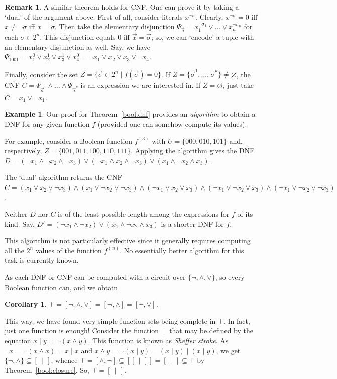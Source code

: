 \documentclass[12pt,notitlepage]{article}
\theoremstyle{plain}
\newtheorem{corr}[thm]{Corollary}
\theoremstyle{definition}
\newtheorem{exm}[thm]{Example}
\newtheorem{rem}[thm]{Remark}
\theoremstyle{plain}
\newcommand{\sbs}{\subseteq}
\newcommand{\void}{\varnothing}
\newcommand{\ul}[1]{\underline{#1}}
\newcommand{\1}{\mathbf{1}}
\newcommand{\0}{\mathbf{0}}
\newcommand{\dvd}{\mathop{\mid}}
\begin{document}
\begin{rem}
A similar theorem holds for CNF. One can prove it by taking a `dual' of the argument above. First of all, consider literals $x^{\neg \sigma}$. Clearly, $x^{\neg \sigma} = 0$ iff $x \neq \neg \sigma$ iff $x = \sigma$. Then take the elementary disjunction $\Psi_{\vec\sigma} = x^{\neg \sigma_1}_1 \vee \ldots \vee x^{\neg \sigma_n}_n$ for each $\sigma \in \ul{2}^n$. This disjunction equals $0$ iff $\vec x = \vec \sigma$; so, we can `encode' a tuple with an elementary disjunction as well. Say, we have $\Psi_{1001} = x^0_1 \vee x^1_2 \vee x^1_3 \vee x^0_4  = \neg x_1 \vee x_2 \vee x_3 \vee \neg x_4$.

Finally, consider the set $Z = \{ \vec \sigma \in \ul{2}^n \mid f(\vec\sigma) = 0 \}$. If $Z = \{\vec\sigma^1, \ldots,  \vec\sigma^k\} \neq \void$, the CNF $C =  \Psi_{\vec \sigma^1} \wedge \ldots \wedge \Psi_{\vec \sigma^k}$ is an expression we are interested in. If $Z = \void$, just take $C = x_1 \vee \neg x_1$.
\end{rem}

\begin{exm}
Our proof for Theorem~\ref{bool:dnf} provides an \emph{algorithm} to obtain a DNF for any given function $f$ (provided one can somehow compute its values).

For example, consider a Boolean function $f^{(3)}$ with $U = \{ 000, 010, 101 \}$ and, respectively, $Z = \{ 001, 011, 100, 110, 111 \}$. Applying the algorithm gives the DNF $D = (\neg x_1 \wedge \neg x_2 \wedge \neg x_3) \vee (\neg x_1 \wedge x_2 \wedge \neg x_3) \vee (x_1 \wedge \neg x_2 \wedge x_3)$.

The `dual' algorithm returns the CNF $C = (x_1 \vee x_2 \vee \neg x_3) \wedge (x_1 \vee \neg x_2 \vee \neg x_3) \wedge (\neg x_1 \vee x_2 \vee x_3) \wedge (\neg x_1 \vee \neg x_2 \vee x_3) \wedge (\neg x_1 \vee \neg x_2 \vee \neg x_3)$.

Neither $D$ nor $C$ is of the least possible length among the expressions for $f$ of its kind. Say,  $D' = (\neg x_1 \wedge \neg x_2) \vee (x_1 \wedge \neg x_2 \wedge x_3)$ is a shorter DNF for $f$. 

This algorithm is not particularly effective since it generally requires computing all the $2^n$ values of the function $f^{(n)}$. No essentially better algorithm for this task is currently known.
\end{exm}
As each DNF or CNF can be computed with a circuit over $\{{\neg}, {\wedge}, {\vee} \}$, so every Boolean function can, and we obtain
\begin{corr}\label{bool:dnf_compl}
$\top = [{\neg}, {\wedge}, {\vee}] = [{\neg}, {\wedge}] = [{\neg}, {\vee}]$.
\end{corr}
This way, we have found very simple function sets being complete in $\top$. In fact, just one function is enough! Consider the function ${\dvd}$ that may be defined by the equation $x \dvd y = \neg (x \wedge y)$. This function is known as \emph{Sheffer stroke}. As $\neg x = \neg (x \wedge x) = x \dvd x$ and $x \wedge y = \neg (x \dvd y) = (x \dvd y) \dvd (x \dvd y)$, we get $\{{\neg}, {\wedge} \} \sbs [\,{\dvd}\, ]$, whence $\top = [{\wedge}, {\neg}] \sbs [[\,{\dvd}\,]] = [\,{\dvd}\,] \sbs \top$ by Theorem~\ref{bool:closure}. So, $\top = [\,{\dvd}\,]$.
\end{document}
